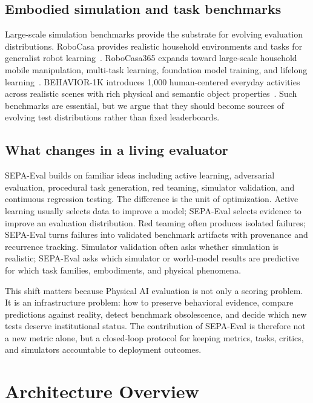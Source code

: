 \documentclass[sigconf,review,anonymous]{acmart}
\newcommand{\system}{SEPA-Eval\xspace}
\begin{document}
\subsection{Embodied simulation and task benchmarks}

Large-scale simulation benchmarks provide the substrate for evolving evaluation distributions. RoboCasa provides realistic household environments and tasks for generalist robot learning~\cite{nasiriany2024robocasa}. RoboCasa365 expands toward large-scale household mobile manipulation, multi-task learning, foundation model training, and lifelong learning~\cite{robocasa3652026}. BEHAVIOR-1K introduces 1,000 human-centered everyday activities across realistic scenes with rich physical and semantic object properties~\cite{li2024behavior1k}. Such benchmarks are essential, but we argue that they should become sources of evolving test distributions rather than fixed leaderboards.

\subsection{What changes in a living evaluator}

\system builds on familiar ideas including active learning, adversarial evaluation, procedural task generation, red teaming, simulator validation, and continuous regression testing. The difference is the unit of optimization. Active learning usually selects data to improve a model; \system selects evidence to improve an evaluation distribution. Red teaming often produces isolated failures; \system turns failures into validated benchmark artifacts with provenance and recurrence tracking. Simulator validation often asks whether simulation is realistic; \system asks which simulator or world-model results are predictive for which task families, embodiments, and physical phenomena.

This shift matters because Physical AI evaluation is not only a scoring problem. It is an infrastructure problem: how to preserve behavioral evidence, compare predictions against reality, detect benchmark obsolescence, and decide which new tests deserve institutional status. The contribution of \system is therefore not a new metric alone, but a closed-loop protocol for keeping metrics, tasks, critics, and simulators accountable to deployment outcomes.

\section{Architecture Overview}
\end{document}

